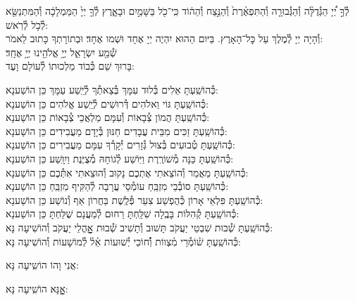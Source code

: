 \documentclass[twoside, openany, parskip=half, 11pt]{book}
\begin{document}
לְ֯ךָ֣ יְ֠יָ הַגְּ֯דֻלָּ֨ה וְ֯הַגְּ֯בוּרָ֤ה וְ֯הַתִּפְאֶ֨רֶת֙ וְ֯הַנֵּ֣צַח וְ֯הַה֔וֹד
כִּֽי־כֹ֖ל בַּשָּׁמַ֣יִם וּבָאָ֑רֶץ לְ֯ךָ֤ יְיָ֙ הַמַּמְלָכָ֔ה
וְ֯הַמִּתְנַשֵּׂ֖א לְ֯כֹ֥ל לְ֯רֹֽאשׁ:\\
וְ֯הָיָה יְיָ לְ֯מֶלֶךְ עַל כׇּל־הָאָרֶץ. בַּיּום הַהוּא יִהְיֶה יְיָ אֶחָד וּשְׁמו אֶחָד׃ וּבְתוֹרָתְךָ כָּתוּב לֵאמֹר: \\
שְׁ֯מַ֖ע יִשְׂרָאֵ֑ל יְיָ֥ אֱלֹהֵ֖ינוּ יְיָ֥ אֶחָֽד׃\\
בָּרוּךְ שֵׁם כְּ֯בוֹד מַלְכוּתוֹ לְ֯עוֹלָם וָעֶד:

\begin{small}
כְּ֯הוֹשַֽׁעְתָּ אֵלִים בְּ֯לוּד עִמָּךְ בְּ֯צֵאתְ֯ךָ לְ֯יֵֽשַׁע עַמָּךְ \hfill כֵּן הוֹשַׁענָא: \\
כְּ֯הוֹשַֽׁעְתָּ גּוֹי וֵאלֹהִים דְּ֯רוּשִׁים לְ֯יֵֽשַׁע אֱלֹהִים \hfill כֵּן הוֹשַׁענָא: \\
כְּ֯הוֹשַֽׁעְתָּ הֲמוֹן צְ֯בָאוֹת וְ֯עִמָּם מַלְאֲכֵי צְ֯בָאוֹת \hfill כֵּן הוֹשַׁענָא: \\
כְּ֯הוֹשַֽׁעְתָּ זַכִּים מִבֵּית עֲבָדִים חַנּוּן בְּ֯יָדָם מַעֲבִידִים \hfill כֵּן הוֹשַׁענָא: \\
כְּ֯הוֹשַֽׁעְתָּ טְ֯בוּעִים בְּ֯צוּל גְּ֯זָרִים יְ֯קָרְ֯ךָ עִמָּם מַעֲבִירִים \hfill כֵּן הוֹשַׁענָא: \\
כְּ֯הוֹשַֽׁעְתָּ כַּנָּה מְ֯שׁוֹרֶֽרֶת וַיּֽוֹשַׁע לְ֯גוֹחָהּ מְ֯צֻיֶּנֶת וַיִוָּֽשַׁע \hfill כֵּן הוֹשַׁענָא: \\
כְּ֯הוֹשַֽׁעְתָּ מַאֲמַר וְ֯הוֹצֵאתִי אֶתְכֶם נָקוּב וְ֯הוּצֵאתִי אִתְּ֯כֶם \hfill כֵּן הוֹשַׁענָא:\\
כְּ֯הוֹשַֽׁעְתָּ סוֹבְ֯בֵי מִזְבֵּֽחַ עוֹמְ֯סֵי עֲרָבָה לְ֯הַקִּיף מִזְבֵּֽחַ \hfill כֵּן הוֹשַׁענָא: \\
כְּ֯הוֹשַֽׁעְתָּ פִּלְאֵי אָרוֹן כְּ֯הֻפְשַׁע צִעֵר פְּ֯לֶֽשֶׁת בַּחֲרוֹן אַף וְ֯נוֹשַׁע \hfill כֵּן הוֹשַׁענָא: \\
כְּ֯הוֹשַֽׁעְתָּ קְ֯הִלּוֹת בָּבֶֽלָה שִׁלַּֽחְתָּ רַחוּם לְ֯מַעֲנָם שֻׁלַּחְתָּ \hfill כֵּן הוֹשַׁענָא:\\
כְּ֯הוֹשַֽׁעְתָּ שְׁ֯בוּת שִׁבְטֵי יַעֲקֹב תָּשׁוּב וְ֯תָשִׁיב שְׁ֯בוּת אׇׇׇׇׇהֳלֵי יַעֲקֹב \hfill וְ֯הוֹשִׁיעָה נָּא:\\
כְּ֯הוֹשַֽׁעְתָּ שׁ֗וֹמְ֯רֵי מִ֗צְווֹת וְ֯֗חוֹכֵי יְ֯שׁוּעוֹת אֵ֗ל֗ לְ֯מוֹשָׁעוֹת \hfill וְ֯הוֹשִׁיעָה נָּא:

\end{small}

\begin{large}
\chazzan
אֲנִי וָהוֹ הוֹשִֽיעָה נָּא:

\shatzvkahal
אׇׇׇׇׇׇנָּא הוֹשִֽׁיעָה נָּא:

\end{large}
\end{document}
